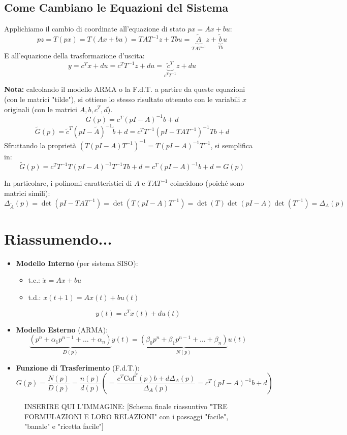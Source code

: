 \documentclass[11pt,a4paper]{article}
\begin{document}
\subsection{Come Cambiano le Equazioni del Sistema}
Applichiamo il cambio di coordinate all'equazione di stato $px = Ax + bu$:
$$ pz = T(px) = T(Ax + bu) = TAT^{-1}z + Tbu = \underbrace{\tilde{A}}_{TAT^{-1}}z + \underbrace{\tilde{b}}_{Tb}u $$
E all'equazione della trasformazione d'uscita:
$$ y = c^Tx + du = c^TT^{-1}z + du = \underbrace{\tilde{c}^T}_{c^TT^{-1}}z + du $$

\textbf{Nota:} calcolando il modello ARMA o la F.d.T. a partire da queste equazioni (con le matrici "tilde"), si ottiene lo stesso risultato ottenuto con le variabili $x$ originali (con le matrici $A, b, c^T, d$).
$$ G(p) = c^T(pI - A)^{-1}b + d $$
$$ \tilde{G}(p) = \tilde{c}^T(pI - \tilde{A})^{-1}\tilde{b} + d = c^TT^{-1}(pI - TAT^{-1})^{-1}Tb + d $$
Sfruttando la proprietà $(T(pI - A)T^{-1})^{-1} = T(pI - A)^{-1}T^{-1}$, si semplifica in:
$$ \tilde{G}(p) = c^T T^{-1} T (pI - A)^{-1} T^{-1} T b + d = c^T(pI - A)^{-1}b + d = G(p) $$

In particolare, i polinomi caratteristici di $A$ e $TAT^{-1}$ coincidono (poiché sono matrici simili):
$$ \Delta_{\tilde{A}}(p) = \det(pI - TAT^{-1}) = \det(T(pI - A)T^{-1}) = \det(T)\det(pI - A)\det(T^{-1}) = \Delta_A(p) $$

\section{Riassumendo...}

\begin{itemize}
    \item \textbf{Modello Interno} (per sistema SISO):
    \begin{itemize}
        \item t.c.: $\dot{x} = Ax + bu$
        \item t.d.: $x(t+1) = Ax(t) + bu(t)$
    \end{itemize}
    $$ y(t) = c^T x(t) + d u(t) $$

    \item \textbf{Modello Esterno} (ARMA):
    $$ \underbrace{(p^n + \alpha_1 p^{n-1} + \dots + \alpha_n)}_{D(p)} y(t) = \underbrace{(\beta_0 p^n + \beta_1 p^{n-1} + \dots + \beta_n)}_{N(p)} u(t) $$

    \item \textbf{Funzione di Trasferimento} (F.d.T.):
    $$ G(p) = \frac{N(p)}{D(p)} = \frac{n(p)}{d(p)} \left( = \frac{c^T \text{Cof}^T(p) b + d \Delta_A(p)}{\Delta_A(p)} = c^T(pI - A)^{-1}b + d \right) $$
\end{itemize}

\begin{figure}[htbp]
    \centering
    \vspace{4cm} %
    \caption{INSERIRE QUI L'IMMAGINE: [Schema finale riassuntivo "TRE FORMULAZIONI E LORO RELAZIONI" con i passaggi "facile", "banale" e "ricetta facile"]}
\end{figure}
\end{document}
